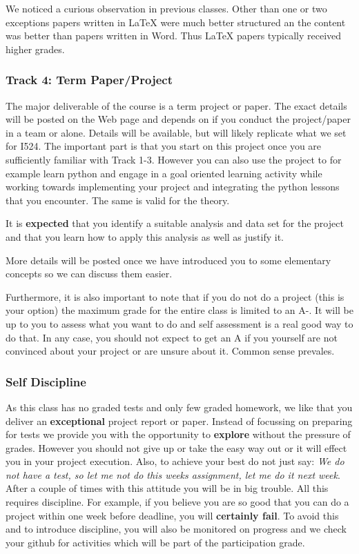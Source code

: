We noticed a curious observation in previous classes. Other
than one or two exceptions papers written in LaTeX were much better
structured an the content was better than papers written in Word. Thus
LaTeX papers typically received higher grades.

\subsubsection{Track 4: Term Paper/Project}

The major deliverable of the course is a term project or paper. The
exact details will be posted on the Web page and depends on if you
conduct the project/paper in a team or alone. Details will be available,
but will likely replicate what we set for I524. The important part is
that you start on this project once you are sufficiently familiar with
Track 1-3. However you can also use the project to for example learn
python and engage in a goal oriented learning activity while working
towards implementing your project and integrating the python lessons
that you encounter. The same is valid for the theory.

It is \textbf{expected} that you identify a suitable analysis and data
set for the project and that you learn how to apply this analysis as
well as justify it.

More details will be posted once we have introduced you to some
elementary concepts so we can discuss them easier.

Furthermore, it is also important to note that if you do not do a
project (this is your option) the maximum grade for the entire class is
limited to an A-. It will be up to you to assess what you want to do and
self assessment is a real good way to do that. In any case, you should
not expect to get an A if you yourself are not convinced about your
project or are unsure about it. Common sense prevales.

\subsubsection{Self Discipline}

As this class has no graded tests and only few graded homework, we like
that you deliver an \textbf{exceptional} project report or paper.
Instead of focussing on preparing for tests we provide you with the
opportunity to \textbf{explore} without the pressure of grades. However
you should not give up or take the easy way out or it will effect you in
your project execution. Also, to achieve your best do not just say:
\emph{We do not have a test, so let me not do this weeks assignment, let
me do it next week}. After a couple of times with this attitude you will
be in big trouble. All this requires discipline. For example, if you
believe you are so good that you can do a project within one week before
deadline, you will \textbf{certainly fail}. To avoid this and to
introduce discipline, you will also be monitored on progress and we
check your github for activities which will be part of the participation
grade.

